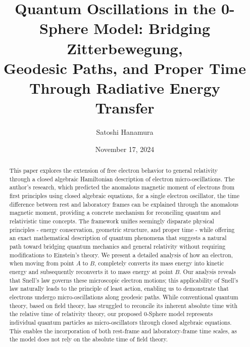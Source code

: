 \documentclass[%
 reprint,
 amsmath,amssymb,
 aps,
]{revtex4-1}
\numberwithin{equation}{section}%
\begin{document}


\title{Quantum Oscillations in the 0-Sphere Model:
Bridging Zitterbewegung,\\ Geodesic Paths, and Proper Time Through Radiative Energy Transfer}
\author{Satoshi Hanamura}
    \date{November 17, 2024}

\begin{abstract}
This paper explores the extension of free electron behavior to general relativity through a closed algebraic Hamiltonian description of electron micro-oscillations. The author's research, which predicted the anomalous magnetic moment of electrons from first principles using closed algebraic equations, for a single electron oscillator, the time difference between rest and laboratory frames can be explained through the anomalous magnetic moment, providing a concrete mechanism for reconciling quantum and relativistic time concepts. The framework unifies seemingly disparate physical principles - energy conservation, geometric structure, and proper time - while offering an exact mathematical description of quantum phenomena that suggests a natural path toward bridging quantum mechanics and general relativity without requiring modifications to Einstein's theory. We present a detailed analysis of how an electron, when moving from point $A$ to $B$, completely converts its mass energy into kinetic energy and subsequently reconverts it to mass energy at point $B$. Our analysis reveals that Snell's law governs these microscopic electron motions; this applicability of Snell's law naturally leads to the principle of least action, enabling us to demonstrate that electrons undergo micro-oscillations along geodesic paths. While conventional quantum theory, based on field theory, has struggled to reconcile its inherent absolute time with the relative time of relativity theory, our proposed 0-Sphere model represents individual quantum particles as micro-oscillators through closed algebraic equations. This enables the incorporation of both rest-frame and laboratory-frame time scales, as the model does not rely on the absolute time of field theory.
\end{abstract}
\end{document}
